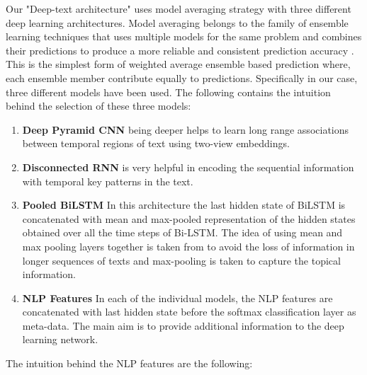 \documentclass[sigconf]{acmart}
\begin{document}
Our "Deep-text architecture" uses model averaging strategy with three different deep learning architectures. Model averaging belongs to the family of ensemble learning techniques that uses multiple models for the same problem and combines their predictions to produce a more reliable and consistent prediction accuracy \cite{ju2018relative}. This is the simplest form of weighted average ensemble based prediction\cite{pawlikowski2019weighted} where, each ensemble member contribute equally to predictions. Specifically in our case, three different models have been used. The following contains the intuition behind the selection of these three models:
\begin{enumerate}
    \item \textbf{Deep Pyramid CNN} \cite{johnson2017deep} being deeper helps to learn long range associations between temporal regions of text using two-view embeddings.
    \item \textbf{Disconnected RNN} \cite{wang2018disconnected} is very helpful in encoding the sequential information with temporal key patterns in the text.
    \item \textbf{Pooled BiLSTM} In this architecture the last hidden state of BiLSTM is concatenated with mean and max-pooled representation of the hidden states obtained over all the time steps of Bi-LSTM. The idea of using mean and max pooling layers together is taken from \cite{RuderH18} to avoid the loss of information in longer sequences of texts and max-pooling is taken to capture the topical information\cite{shen2014latent}. 
    \item \textbf{NLP Features} In each of the individual models, the NLP features are concatenated with last hidden state before the softmax classification layer as meta-data. The main aim is to provide additional information to the deep learning network.
\end{enumerate}
The intuition behind the NLP features are the following: 
\end{document}
